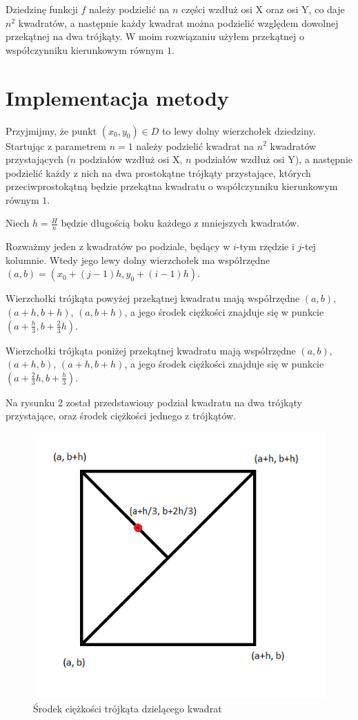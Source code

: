 \documentclass[12pt]{article}
\begin{document}
	Dziedzinę funkcji $f$ należy podzielić na $n$ części wzdłuż osi X oraz osi Y, co daje $n^2$ kwadratów, a następnie każdy kwadrat można podzielić względem dowolnej przekątnej na dwa trójkąty. W moim rozwiązaniu użyłem przekątnej o współczynniku kierunkowym równym $1$.
	
	\section{Implementacja metody}
	Przyjmijmy, że punkt $(x_0, y_0) \in D$ to lewy dolny wierzchołek dziedziny. Startując z parametrem $n = 1$ należy podzielić kwadrat na $n^2$ kwadratów przystających ($n$ podziałów wzdłuż osi X, $n$ podziałów wzdłuż osi Y), a następnie podzielić każdy z nich na dwa prostokątne trójkąty przystające, których przeciwprostokątną będzie przekątna kwadratu o współczynniku kierunkowym równym $1$.
	
	Niech $h = \frac{H}{n}$ będzie długością boku każdego z mniejszych kwadratów.
	
	Rozważmy jeden z kwadratów po podziale, będący w $i$-tym rzędzie i $j$-tej kolumnie. Wtedy jego lewy dolny wierzchołek ma współrzędne $(a, b) = (x_0 + (j-1)h, y_0 + (i-1)h)$.
	
	Wierzchołki trójkąta powyżej przekątnej kwadratu mają współrzędne $(a, b)$, $(a + h, b + h)$, $(a, b + h)$, a jego środek ciężkości znajduje się w punkcie $(a + \frac{h}{3}, b + \frac{2}{3}h)$.
	
	Wierzchołki trójkąta poniżej przekątnej kwadratu mają współrzędne $(a, b)$, $(a + h, b)$, $(a + h, b + h)$, a jego środek ciężkości znajduje się w punkcie $(a + \frac{2}{3}h, b + \frac{h}{3})$.
	
	Na rysunku 2 został przedstawiony podział kwadratu na dwa trójkąty przystające, oraz środek ciężkości jednego z trójkątów.
	
	\pagebreak
	
	\begin{figure}
		\centering
		\includegraphics[scale=1]{images/single-square-gravity-center.png}
		\caption{Środek ciężkości trójkąta dzielącego kwadrat}
	\end{figure}
	
\end{document}
